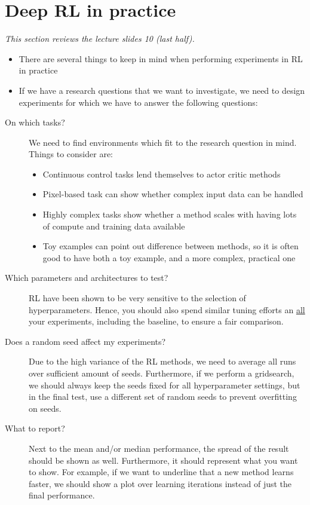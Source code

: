 \section{Deep RL in practice}
\textit{This section reviews the lecture slides 10 (last half).}
\begin{itemize}
	\item There are several things to keep in mind when performing experiments in RL in practice
	\item If we have a research questions that we want to investigate, we need to design experiments for which we have to answer the following questions:
\end{itemize}
\begin{description}
	\item[On which tasks?] We need to find environments which fit to the research question in mind. Things to consider are:
	\begin{itemize}
		\item Continuous control tasks lend themselves to actor critic methods
		\item Pixel-based task can show whether complex input data can be handled
		\item Highly complex tasks show whether a method scales with having lots of compute and training data available
		\item Toy examples can point out difference between methods, so it is often good to have both a toy example, and a more complex, practical one
	\end{itemize}
	\item[Which parameters and architectures to test?] RL have been shown to be very sensitive to the selection of hyperparameters. Hence, you should also spend similar tuning efforts an \underline{all} your experiments, including the baseline, to ensure a fair comparison.
	\item[Does a random seed affect my experiments?] Due to the high variance of the RL methods, we need to average all runs over sufficient amount of seeds. Furthermore, if we perform a gridsearch, we should always keep the seeds fixed for all hyperparameter settings, but in the final test, use a different set of random seeds to prevent overfitting on seeds.
	\item[What to report?] Next to the mean and/or median performance, the spread of the result should be shown as well. Furthermore, it should represent what you want to show. For example, if we want to underline that a new method learns faster, we should show a plot over learning iterations instead of just the final performance.
\end{description}
